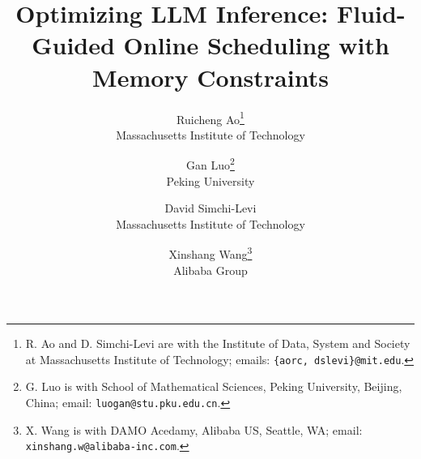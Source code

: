 \documentclass{article}
\begin{document}
\title{Optimizing LLM Inference: Fluid-Guided Online Scheduling with Memory Constraints}
\author{Ruicheng Ao\thanks{R. Ao and D. Simchi-Levi are with the Institute of Data, System and Society at Massachusetts Institute of Technology; emails: {\tt\small \{aorc, dslevi\}@mit.edu}.}\\
Massachusetts Institute of Technology \\
\and
Gan Luo\thanks{G. Luo is with School of Mathematical Sciences, Peking University, Beijing, China; email: {\tt\small luogan@stu.pku.edu.cn}.} \\
Peking University \\
\and David Simchi-Levi\footnotemark[1]\\
Massachusetts Institute of Technology
\and
Xinshang Wang\thanks{X. Wang is with DAMO Acedamy, Alibaba US, Seattle, WA; email: {\tt\small xinshang.w@alibaba-inc.com}.} \\
Alibaba Group \\
}
\maketitle




\end{document}

